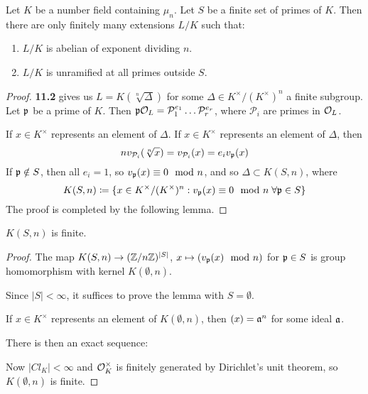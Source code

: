 \documentclass[10pt,a4paper]{article}
\begin{document}
\begin{proposition}
  Let $K$ be a number field containing $\mu_n$. Let $S$ be a finite set of primes of $K$. Then there are only finitely many extensions $L/K$ such that:
  \begin{enumerate}
    \item $L/K$ is abelian of exponent dividing $n$.
    \item $L/K$ is unramified at all primes outside $S$.
  \end{enumerate}
\end{proposition}
\begin{proof}
  \textbf{11.2} gives us $L = K(\sqrt[n]{\Delta})$ for some $\Delta \in K^\times/(K^\times)^n$ a finite subgroup. Let $\mathfrak{p}$ be a prime of $K$. Then $\mathfrak{p}\mathcal{O}_L = \mathcal{P}_1^{e_1} \ldots \mathcal{P}_r^{e_r}$, where $\mathcal{P}_i$ are primes in $\mathcal{O}_L$.

  If $x \in K^\times$ represents an element of $\Delta$. If $x \in K^\times$ represents an element of $\Delta$, then
  \[nv_{\mathcal{P}_i}(\sqrt[n]{x}) = v_{\mathcal{P}_i}(x) = e_i v_{\mathfrak{p}}(x)\]
  If $\mathfrak{p} \notin S$, then all $e_i =1$, so $v_{\mathfrak{p}}(x) \equiv 0 \mod n$, and so $\Delta \subset K(S, n)$, where
  \[K(S, n) \coloneqq \{x \in K^\times/(K^\times)^n : v_\p(x) \equiv 0 \mod n \forall \p \in S\}\]
  The proof is completed by the following lemma.
\end{proof}
\begin{lemma}
  $K(S,n)$ is finite.
\end{lemma}
\begin{proof}
  The map $K(S,n) \to (\mathbb{Z}/n\mathbb{Z})^{|S|}$, $x \mapsto (v_{\mathfrak{p}}(x) \mod n)$ for $\mathfrak{p} \in S$ is group homomorphism with kernel $K(\emptyset, n)$.

  Since $|S|<\infty$, it suffices to prove the lemma with $S = \emptyset$.

  If $x \in K^\times$ represents an element of $K(\emptyset, n)$, then $(x) = \mathfrak{a}^n$ for some ideal $\mathfrak{a}$.

  There is then an exact sequence:
  \begin{center}
  \end{center}
  Now $|Cl_K|<\infty$ and $\mathcal{O}_K^\times$ is finitely generated by Dirichlet's unit theorem, so $K(\emptyset, n)$ is finite.
\end{proof}
\end{document}
